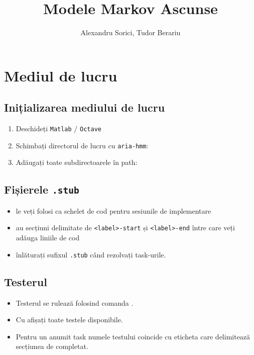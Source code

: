 \documentclass[12pt]{article}
\title{Modele Markov Ascunse}
\author{Alexandru Sorici, Tudor Berariu}
\institute{Asociația Română pentru Inteligență Artificială}
\begin{document}
\mytitlepage
\tableofcontents

\section{Mediul de lucru}
\label{sec:framework}

\subsection{Inițializarea mediului de lucru}
\label{sec:init}

\begin{enumerate}
\item Deschideți \texttt{Matlab} / \texttt{Octave}
\item Schimbați directorul de lucru cu \texttt{aria-hmm}:\\
\item Adăugați toate subdirectoarele în path:\\
\end{enumerate}

\subsection{Fișierele \texttt{.stub}}
\label{sec:stubs}

\begin{itemize}
\item le veți folosi ca schelet de cod pentru sesiunile de implementare
\item au secțiuni delimitate de \texttt{<label>-start} și \texttt{<label>-end}
  între care veți adăuga liniile de cod
\item înlăturați sufixul \texttt{.stub} când rezolvați task-urile.
\end{itemize}


\subsection{Testerul}
\label{sec:tester}

\begin{itemize}
\item Testerul se rulează folosind comanda .
  
\item Cu  afișați toate testele disponibile.
\item Pentru un anumit task numele testului coincide cu eticheta care delimitează secțiunea de completat.
\end{itemize}
\end{document}

